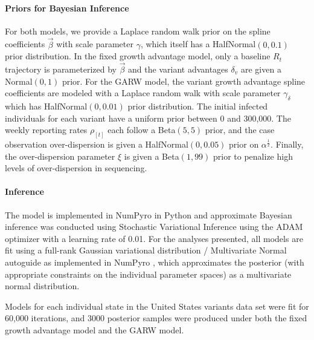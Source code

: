 
\paragraph{Priors for Bayesian Inference}%

For both models, we provide a Laplace random walk prior on the spline coefficients $\vec{\beta}$ with scale parameter $\gamma$, which itself has a HalfNormal$(0, 0.1)$ prior distribution.
In the fixed growth advantage model, only a baseline $R_{t}$ trajectory is parameterized by $\vec{\beta}$ and the variant advantages $\delta_{v}$ are given a Normal$(0,1)$ prior.
For the GARW model, the variant growth advantage spline coefficients are modeled with a Laplace random walk with scale parameter $\gamma_{\delta}$ which has HalfNormal$(0, 0.01)$ prior distribution.
The initial infected individuals for each variant have a uniform prior between 0 and 300,000.
The weekly reporting rates $\rho_{[t]}$ each follow a Beta$(5, 5)$ prior, and the case observation over-dispersion is given a HalfNormal$(0, 0.05)$ prior on $\alpha^{\frac{1}{2}}$.
Finally, the over-dispersion parameter $\xi$ is given a Beta$(1, 99)$ prior to penalize high levels of over-dispersion in sequencing.

\paragraph{Inference}

The model is implemented in NumPyro \cite{phan2019composable} in Python and approximate Bayesian inference was conducted using Stochastic Variational Inference \cite{hoffman2013svi} using the ADAM optimizer \cite{kingma2017adam} with a learning rate of 0.01. For the analyses presented, all models are fit using a full-rank Gaussian variational distribution / Multivariate Normal autoguide as implemented in NumPyro \cite{phan2019composable}, which approximates the posterior (with appropriate constraints on the individual parameter spaces) as a multivariate normal distribution.

Models for each individual state in the United States variants data set were fit for 60,000 iterations, and 3000 posterior samples were produced under both the fixed growth advantage model and the GARW model.

